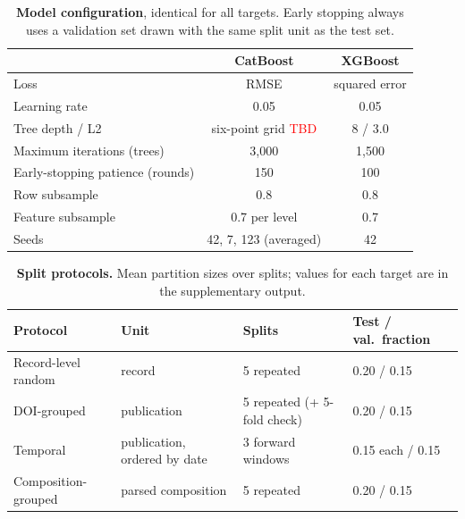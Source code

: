 \documentclass[11pt]{article}
\newif\ifshowTBDkeys
\newcommand{\TBDcell}[1]{\ifshowTBDkeys\textcolor{red}{\scriptsize\texttt{\detokenize{#1}}}\else\textcolor{red}{TBD}\fi}
\begin{document}
\begin{table}[htbp]
    \centering\small
    \caption{\textbf{Model configuration}, identical for all targets. Early stopping always uses a validation set drawn with the same split unit as the test set.}
    \label{tab:config}
    \begin{tabular}{@{}lcc@{}}
        \toprule
        & CatBoost & XGBoost \\
        \midrule
        Loss                               & RMSE & squared error \\
        Learning rate                      & 0.05 & 0.05 \\
        Tree depth / L2                    & six-point grid \TBDcell{cfg/grid} & 8 / 3.0 \\
        Maximum iterations (trees)         & 3,000 & 1,500 \\
        Early-stopping patience (rounds)   & 150 & 100 \\
        Row subsample                      & 0.8 & 0.8 \\
        Feature subsample                  & 0.7 per level & 0.7 \\
        Seeds                              & 42, 7, 123 (averaged) & 42 \\
        \bottomrule
    \end{tabular}
\end{table}

\begin{table}[htbp]
    \centering\small
    \caption{\textbf{Split protocols.} Mean partition sizes over splits; values for each target are in the supplementary output.}
    \label{tab:protocol}
    \begin{tabular}{@{}llll@{}}
        \toprule
        Protocol & Unit & Splits & Test / val.\ fraction \\
        \midrule
        Record-level random & record & 5 repeated & 0.20 / 0.15 \\
        DOI-grouped & publication & 5 repeated (+ 5-fold check) & 0.20 / 0.15 \\
        Temporal & publication, ordered by date & 3 forward windows & 0.15 each / 0.15 \\
        Composition-grouped & parsed composition & 5 repeated & 0.20 / 0.15 \\
        \bottomrule
    \end{tabular}
\end{table}
\end{document}
